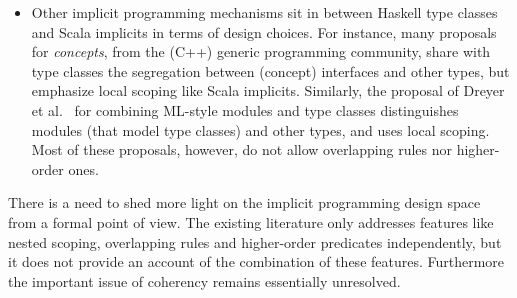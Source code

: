 \begin{itemize}



\item Other implicit programming mechanisms sit in between Haskell
  type classes and Scala implicits in terms of design choices. For
  instance, many proposals for \emph{concepts}, from the (C++) generic
  programming community, share with type 
classes the segregation between (concept) interfaces and other types, but
emphasize local scoping like Scala implicits. Similarly, the proposal of Dreyer et al.~\cite{modular}
for combining ML-style modules and type classes distinguishes
modules (that model type classes) and other types, and uses local
scoping. Most of these proposals, however, do not allow overlapping rules nor
higher-order ones.

\end{itemize}

There is a need to shed more light on the implicit
programming design space from a formal point of view. The existing
literature only addresses features like nested scoping, 
overlapping rules and higher-order predicates independently, but 
it does not provide an account of the combination of these features.
Furthermore the important issue of coherency remains essentially unresolved. 

